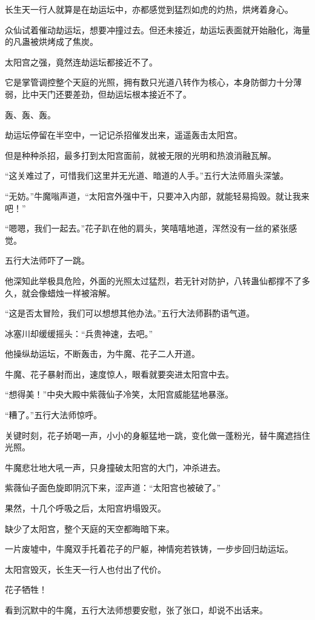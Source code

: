 \begin{this_body}
长生天一行人就算是在劫运坛中，亦都感觉到猛烈如虎的灼热，烘烤着身心。

众仙试着催动劫运坛，想要冲撞过去。但还未接近，劫运坛表面就开始融化，海量的凡蛊被烘烤成了焦炭。

太阳宫之强，竟然连劫运坛都接近不了。

它是掌管调控整个天庭的光照，拥有数只光道八转作为核心，本身防御力十分薄弱，比中天门还要差劲，但劫运坛根本接近不了。

轰、轰、轰。

劫运坛停留在半空中，一记记杀招催发出来，遥遥轰击太阳宫。

但是种种杀招，最多打到太阳宫面前，就被无限的光明和热浪消融瓦解。

“这关难过了，可惜我们这里并无光道、暗道的人手。”五行大法师眉头深皱。

“无妨。”牛魔嗡声道，“太阳宫外强中干，只要冲入内部，就能轻易捣毁。就让我来吧！”

“嗯嗯，我们一起去。”花子趴在他的肩头，笑嘻嘻地道，浑然没有一丝的紧张感觉。

五行大法师吓了一跳。

他深知此举极具危险，外面的光照太过猛烈，若无针对防护，八转蛊仙都撑不了多久，就会像蜡烛一样被溶解。

“这是否太冒险，我们可以想想其他办法。”五行大法师斟酌语气道。

冰塞川却缓缓摇头：“兵贵神速，去吧。”

他操纵劫运坛，不断轰击，为牛魔、花子二人开道。

牛魔、花子暴射而出，速度惊人，眼看就要突进太阳宫中去。

“想得美！”中央大殿中紫薇仙子冷笑，太阳宫威能猛地暴涨。

“糟了。”五行大法师惊呼。

关键时刻，花子娇喝一声，小小的身躯猛地一跳，变化做一蓬粉光，替牛魔遮挡住光照。

牛魔悲壮地大吼一声，只身撞破太阳宫的大门，冲杀进去。

紫薇仙子面色旋即阴沉下来，涩声道：“太阳宫也被破了。”

果然，十几个呼吸之后，太阳宫坍塌毁灭。

缺少了太阳宫，整个天庭的天空都晦暗下来。

一片废墟中，牛魔双手托着花子的尸躯，神情宛若铁铸，一步步回归劫运坛。

太阳宫毁灭，长生天一行人也付出了代价。

花子牺牲！

看到沉默中的牛魔，五行大法师想要安慰，张了张口，却说不出话来。


\end{this_body}
